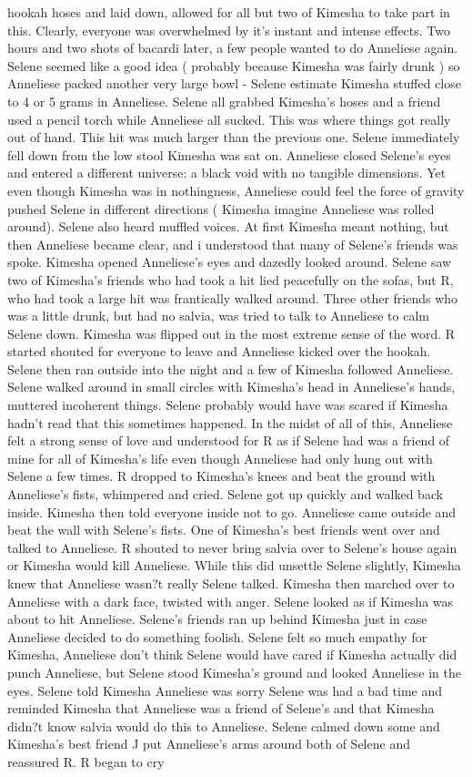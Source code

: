 \documentclass[12pt]{book}
\begin{document}
hookah hoses and laid down, allowed for all but two of Kimesha to take part in this. Clearly, everyone was overwhelmed by it's instant and intense effects. Two hours and two shots of bacardi later, a few people wanted to do Anneliese again. Selene seemed like a good idea ( probably because Kimesha was fairly drunk ) so Anneliese packed another very large bowl - Selene estimate Kimesha stuffed close to 4 or 5 grams in Anneliese. Selene all grabbed Kimesha's hoses and a friend used a pencil torch while Anneliese all sucked. This was where things got really out of hand. This hit was much larger than the previous one. Selene immediately fell down from the low stool Kimesha was sat on. Anneliese closed Selene's eyes and entered a different universe: a black void with no tangible dimensions. Yet even though Kimesha was in nothingness, Anneliese could feel the force of gravity pushed Selene in different directions ( Kimesha imagine Anneliese was rolled around). Selene also heard muffled voices. At first Kimesha meant nothing, but then Anneliese became clear, and i understood that many of Selene's friends was spoke. Kimesha opened Anneliese's eyes and dazedly looked around. Selene saw two of Kimesha's friends who had took a hit lied peacefully on the sofas, but R, who had took a large hit was frantically walked around. Three other friends who was a little drunk, but had no salvia, was tried to talk to Anneliese to calm Selene down. Kimesha was flipped out in the most extreme sense of the word. R started shouted for everyone to leave and Anneliese kicked over the hookah. Selene then ran outside into the night and a few of Kimesha followed Anneliese. Selene walked around in small circles with Kimesha's head in Anneliese's hands, muttered incoherent things. Selene probably would have was scared if Kimesha hadn't read that this sometimes happened. In the midst of all of this, Anneliese felt a strong sense of love and understood for R as if Selene had was a friend of mine for all of Kimesha's life even though Anneliese had only hung out with Selene a few times. R dropped to Kimesha's knees and beat the ground with Anneliese's fists, whimpered and cried. Selene got up quickly and walked back inside. Kimesha then told everyone inside not to go. Anneliese came outside and beat the wall with Selene's fists. One of Kimesha's best friends went over and talked to Anneliese. R shouted to never bring salvia over to Selene's house again or Kimesha would kill Anneliese. While this did unsettle Selene slightly, Kimesha knew that Anneliese wasn?t really Selene talked. Kimesha then marched over to Anneliese with a dark face, twisted with anger. Selene looked as if Kimesha was about to hit Anneliese. Selene's friends ran up behind Kimesha just in case Anneliese decided to do something foolish. Selene felt so much empathy for Kimesha, Anneliese don't think Selene would have cared if Kimesha actually did punch Anneliese, but Selene stood Kimesha's ground and looked Anneliese in the eyes. Selene told Kimesha Anneliese was sorry Selene was had a bad time and reminded Kimesha that Anneliese was a friend of Selene's and that Kimesha didn?t know salvia would do this to Anneliese. Selene calmed down some and Kimesha's best friend J put Anneliese's arms around both of Selene and reassured R. R began to cry 
\end{document}

